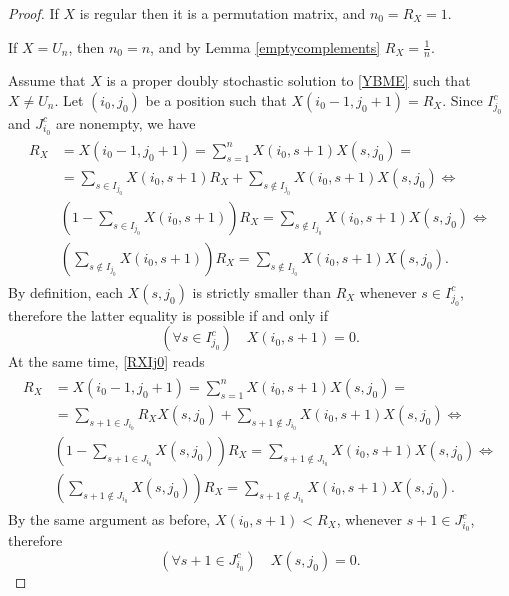 \documentclass{article}
\theoremstyle{definition}\newtheorem{example}{Example}[section]
\begin{document}
	\begin{proof}
		If $X$ is regular then it is a permutation matrix, and $n_0=R_X=1$.
		
		If $X=U_n$, then $n_0=n$, and by Lemma \ref{emptycomplements} $R_X=\frac{1}{n}$. 
		
		Assume that $X$ is a proper doubly stochastic solution to \eqref{YBME} such that $X\neq U_n$. Let $(i_0,j_0)$ be a position such that $X(i_0-1,j_0+1)=R_X$. Since $I_{j_0}^c$ and $J_{i_0}^c$ are nonempty, we have
		\begin{eqnarray}\label{RXIj0}
			\begin{aligned}
				R_X&=X(i_0-1,j_0+1)=\sum_{s=1}^nX(i_0,s+1)X(s,j_0)=\\
				&=\sum_{s\in I_{j_0}}X(i_0,s+1)R_X+\sum_{s\notin I_{j_0}}X(i_0,s+1)X(s,j_0)\Leftrightarrow\\
				&\left(1-\sum_{s\in I_{j_0}}X(i_0,s+1)\right)R_X=\sum_{s\notin I_{j_0}}X(i_0,s+1)X(s,j_0)\Leftrightarrow\\
				&\left(\sum_{s\notin I_{j_0}}X(i_0,s+1)\right)R_X=\sum_{s\notin I_{j_0}}X(i_0,s+1)X(s,j_0).
			\end{aligned}
		\end{eqnarray}
		By definition, each $X(s,j_0)$ is strictly smaller than $R_X$ whenever $s\in I_{j_0}^c$, therefore the latter equality is possible if and only if 
		\begin{equation}\label{Ij0}
			\left(\forall s\in I_{j_0}^c\right)\quad X(i_0,s+1)=0.
		\end{equation}
		At the same time, \eqref{RXIj0} reads 
		\begin{eqnarray}\label{RXJi0}
			\begin{aligned}
				R_X&=X(i_0-1,j_0+1)=\sum_{s=1}^nX(i_0,s+1)X(s,j_0)=\\
				&=\sum_{s+1\in J_{i_0}}R_X X(s,j_0)+\sum_{s+1\notin J_{i_0}}X(i_0,s+1)X(s,j_0)\Leftrightarrow\\
				&\left(1-\sum_{s+1\in J_{i_0}}X(s,j_0)\right)R_X=\sum_{s+1\notin J_{i_0}}X(i_0,s+1)X(s,j_0)\Leftrightarrow\\
				&\left(\sum_{s+1\notin J_{i_0}}X(s,j_0)\right)R_X=\sum_{s+1\notin J_{i_0}}X(i_0,s+1)X(s,j_0).
			\end{aligned}
		\end{eqnarray}
		By the same argument as before, $X(i_0,s+1)<R_X$, whenever $s+1\in J_{i_0}^c$,  therefore
		\begin{equation}\label{Ji0} \left(\forall s+1\in J_{i_0}^c\right)\quad  X(s,j_0)=0.
		\end{equation}

\end{proof}
\end{document}
